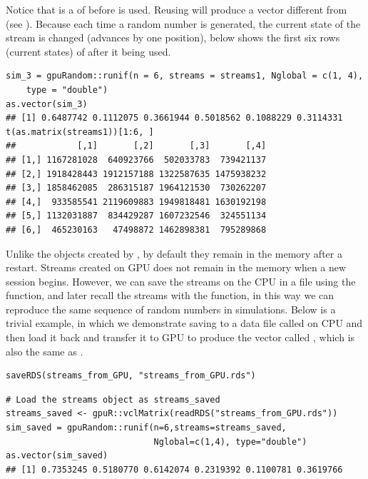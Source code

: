 \documentclass[article,nojss]{jss}\usepackage[]{graphicx}\usepackage[]{color}
\makeatletter
\newenvironment{kframe}{%
 \def\at@end@of@kframe{}%
 \ifinner\ifhmode%
  \def\at@end@of@kframe{\end{minipage}}%
  \begin{minipage}{\columnwidth}%
 \fi\fi%
 \def\FrameCommand##1{\hskip\@totalleftmargin \hskip-\fboxsep
 \colorbox{shadecolor}{##1}\hskip-\fboxsep
     \hskip-\linewidth \hskip-\@totalleftmargin \hskip\columnwidth}%
 \MakeFramed {\advance\hsize-\width
   \@totalleftmargin\z@ \linewidth\hsize
   \@setminipage}}%
 {\par\unskip\endMakeFramed%
 \at@end@of@kframe}
\newenvironment{knitrout}{}{} %
\newcommand{\fct}[1]{\code{#1()}}
\makeatother
\begin{document}
Notice that  is a  of  before  is used. Reusing  will produce a vector different from  (see ). Because each time a random number is generated, the current state of the stream is changed (advances by one position), below shows the first six rows (current states) of  after it being used.
\begin{knitrout}
\color{fgcolor}\begin{kframe}
\begin{verbatim}
sim_3 = gpuRandom::runif(n = 6, streams = streams1, Nglobal = c(1, 4),
    type = "double")
as.vector(sim_3)
## [1] 0.6487742 0.1112075 0.3661944 0.5018562 0.1088229 0.3114331
t(as.matrix(streams1))[1:6, ]
##            [,1]       [,2]       [,3]       [,4]
## [1,] 1167281028  640923766  502033783  739421137
## [2,] 1918428443 1912157188 1322587635 1475938232
## [3,] 1858462085  286315187 1964121530  730262207
## [4,]  933585541 2119609883 1949818481 1630192198
## [5,] 1132031887  834429287 1607232546  324551134
## [6,]  465230163   47498872 1462898381  795289868
\end{verbatim}
\end{kframe}
\end{knitrout}
Unlike the objects created by , by default they remain in the memory after a restart. Streams created on GPU does not remain in the memory when a new  session begins. However, we can save the streams on the CPU in a file using the \fct{save} function, and later recall the streams with the \fct{load} function, in this way we can reproduce the same sequence of random numbers in simulations. Below is a trivial example, in which we demonstrate saving  to a data file called  on CPU and then load it back and transfer it to GPU to produce the vector called , which is also the same as .
\begin{knitrout}
\color{fgcolor}\begin{kframe}
\begin{verbatim}
saveRDS(streams_from_GPU, "streams_from_GPU.rds")
\end{verbatim}
\end{kframe}
\end{knitrout}
\begin{knitrout}
\color{fgcolor}\begin{kframe}
\begin{verbatim}
# Load the streams object as streams_saved
streams_saved <- gpuR::vclMatrix(readRDS("streams_from_GPU.rds"))
sim_saved = gpuRandom::runif(n=6,streams=streams_saved, 
                             Nglobal=c(1,4), type="double")
as.vector(sim_saved)
## [1] 0.7353245 0.5180770 0.6142074 0.2319392 0.1100781 0.3619766
\end{verbatim}
\end{kframe}
\end{knitrout}
\end{document}
